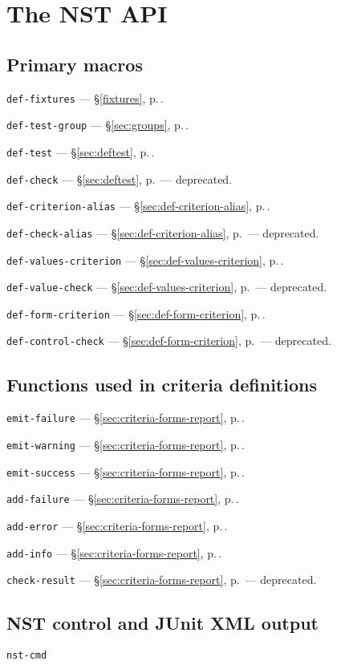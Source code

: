 
\section{The NST API}
\def\secpageref#1{ --- \S\ref{#1}, p.\,\pageref{#1}}

\subsection{Primary macros}
\texttt{def-fixtures}\secpageref{fixtures}.

\texttt{def-test-group}\secpageref{sec:groups}.

\texttt{def-test}\secpageref{sec:deftest}.

\texttt{def-check}\secpageref{sec:deftest} --- deprecated.

\texttt{def-criterion-alias}\secpageref{sec:def-criterion-alias}.

\texttt{def-check-alias}\secpageref{sec:def-criterion-alias} ---
deprecated.

\texttt{def-values-criterion}\secpageref{sec:def-values-criterion}.

\texttt{def-value-check}\secpageref{sec:def-values-criterion} ---
deprecated.

\texttt{def-form-criterion}\secpageref{sec:def-form-criterion}.

\texttt{def-control-check}\secpageref{sec:def-form-criterion} ---
deprecated.

\subsection{Functions used in criteria definitions}

\texttt{emit-failure}\secpageref{sec:criteria-forms-report}.

\texttt{emit-warning}\secpageref{sec:criteria-forms-report}.

\texttt{emit-success}\secpageref{sec:criteria-forms-report}.

\texttt{add-failure}\secpageref{sec:criteria-forms-report}.

\texttt{add-error}\secpageref{sec:criteria-forms-report}.

\texttt{add-info}\secpageref{sec:criteria-forms-report}.

\texttt{check-result}\secpageref{sec:criteria-forms-report} ---
deprecated.
             
\subsection{NST control and JUnit XML output}
\texttt{nst-cmd}

